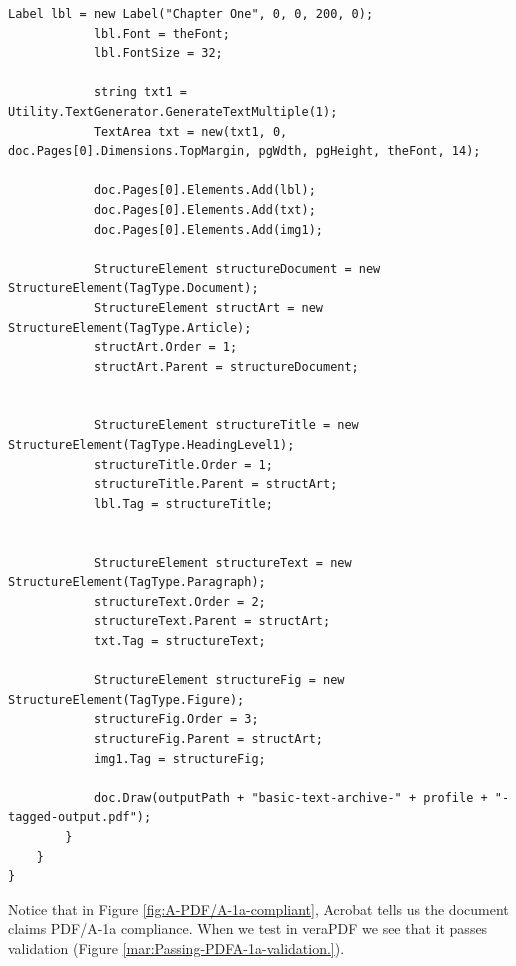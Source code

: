 \documentclass[american]{tufte-book}
\numberwithin{equation}{section}
\numberwithin{figure}{section}
\begin{document}
{{\begin{lstlisting}[caption={Creating a PDF/A-1a PDF document.},label={lis:Creating-a-PDF/A-1a-1},basicstyle={\footnotesize\ttfamily},breaklines=true]
            Label lbl = new Label("Chapter One", 0, 0, 200, 0);
            lbl.Font = theFont;
            lbl.FontSize = 32;

            string txt1 = Utility.TextGenerator.GenerateTextMultiple(1);
            TextArea txt = new(txt1, 0, doc.Pages[0].Dimensions.TopMargin, pgWdth, pgHeight, theFont, 14);

            doc.Pages[0].Elements.Add(lbl);
            doc.Pages[0].Elements.Add(txt);
            doc.Pages[0].Elements.Add(img1);

            StructureElement structureDocument = new StructureElement(TagType.Document);
            StructureElement structArt = new StructureElement(TagType.Article);
            structArt.Order = 1;
            structArt.Parent = structureDocument;


            StructureElement structureTitle = new StructureElement(TagType.HeadingLevel1);
            structureTitle.Order = 1;
            structureTitle.Parent = structArt;
            lbl.Tag = structureTitle;


            StructureElement structureText = new StructureElement(TagType.Paragraph);
            structureText.Order = 2;
            structureText.Parent = structArt;
            txt.Tag = structureText;

            StructureElement structureFig = new StructureElement(TagType.Figure);
            structureFig.Order = 3;
            structureFig.Parent = structArt;
            img1.Tag = structureFig;

            doc.Draw(outputPath + "basic-text-archive-" + profile + "-tagged-output.pdf");
        }
    }
}
\end{lstlisting}
\leavevmode\egroup

Notice that in Figure \ref{fig:A-PDF/A-1a-compliant}, Acrobat tells
us the document claims PDF/A-1a compliance. When we test in veraPDF
we see that it passes validation (Figure \ref{mar:Passing-PDFA-1a-validation.}).
}}
\end{document}
